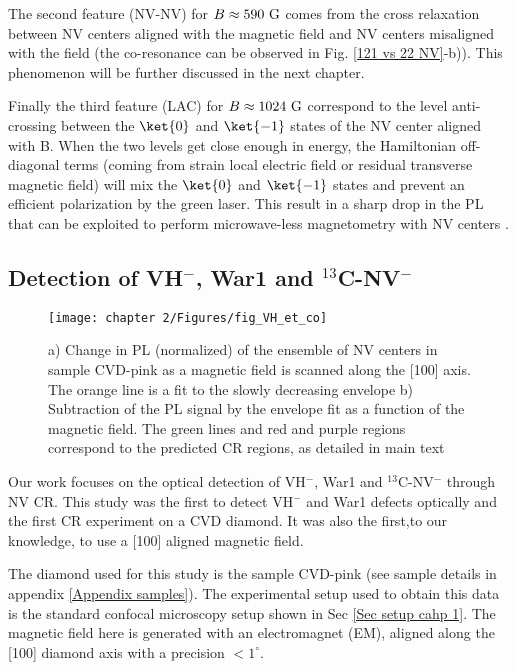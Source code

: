 \documentclass[a4paper, 11pt]{report}
\begin{document}
The second feature (NV-NV) for $B\approx 590 \ \rm G$ comes from the cross relaxation between NV centers aligned with the magnetic field and NV centers misaligned with the field (the co-resonance can be observed in Fig. \ref{121 vs 22 NV}-b)). This phenomenon will be further discussed in the next chapter.

Finally the third feature (LAC) for $B\approx 1024 \ \rm G$ correspond to the level anti-crossing between the $\ket{0}$ and $\ket{-1}$ states of the NV center aligned with B. When the two levels get close enough in energy, the Hamiltonian off-diagonal terms (coming from strain local electric field or residual transverse magnetic field) will mix the $\ket{0}$ and $\ket{-1}$ states and prevent an efficient polarization by the green laser. This result in a sharp drop in the PL that can be exploited to perform microwave-less magnetometry with NV centers \citep{wickenbrock2016microwave, zheng2017level, zheng2020microwave}.

\subsection{Detection of VH$^-$, War1 and $^{13}$C-NV$^-$}

\begin{figure}[h]
\centering
\texttt{[image: chapter 2/Figures/fig\_VH\_et\_co]}
\caption{a) Change in PL (normalized) of the ensemble of NV centers in sample CVD-pink as a magnetic field is scanned along the [100] axis. The orange line is a fit to the slowly decreasing envelope b) Subtraction of the PL signal by the envelope fit as a function of the magnetic field. The green lines and red and purple regions correspond to the predicted CR regions, as detailed in main text}
\label{CR VH exp}
\end{figure}

Our work \citep{pellet2021optical} focuses on the optical detection of VH$^-$, War1 and $^{13}$C-NV$^-$ through NV CR. This study was the first to detect VH$^-$ and War1 defects optically and the first CR experiment on a CVD diamond. It was also the first,to our knowledge, to use a [100] aligned magnetic field.

The diamond used for this study is the sample CVD-pink (see sample details in appendix \ref{Appendix samples}). The experimental setup used to obtain this data is the standard confocal microscopy setup shown in Sec \ref{Sec setup cahp 1}. The magnetic field here is generated with an electromagnet (EM), aligned along the [100] diamond axis with a precision $<1^\circ$. 
\end{document}
